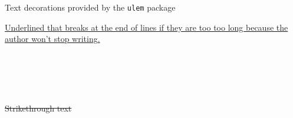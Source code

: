 \begin{frame}{Text decorations provided by the
    \texttt{ulem} package}
    
    
    \uline{Underlined that breaks at the end of lines if
    they are too too long because the author won’t stop
    writing.} \\~\\
    
    
     \\~\\
    
     \\~\\
    
    \sout{Strikethrough text} \\~\\
    
     \\~\\
    
     \\~\\ 
    
    
\end{frame}
    